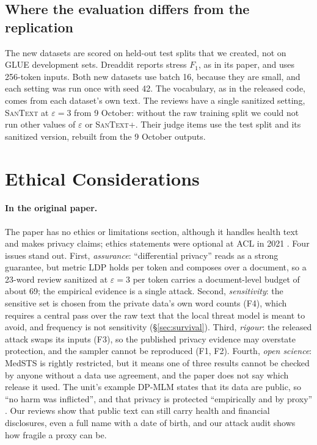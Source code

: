 \documentclass[11pt]{article}
\newcommand{\santext}{\textsc{SanText}}
\newcommand{\santextp}{\textsc{SanText}+}
\begin{document}
\subsection{Where the evaluation differs from the replication}
\label{sec:differs}
The new datasets are scored on held-out test splits that we created, not on GLUE development sets. Dreaddit reports stress $F_1$, as in its paper, and uses 256-token inputs. Both new datasets use batch 16, because they are small, and each setting was run once with seed 42. The vocabulary, as in the released code, comes from each dataset's own text. The reviews have a single sanitized setting, \santext{} at $\varepsilon = 3$ from 9 October: without the raw training split we could not run other values of $\varepsilon$ or \santextp{}. Their judge items use the test split and its sanitized version, rebuilt from the 9 October outputs.

\section{Ethical Considerations}
\label{sec:ethics}
\paragraph{In the original paper.} The paper has no ethics or limitations section, although it handles health text and makes privacy claims; ethics statements were optional at ACL in 2021 \citep{benotti-blackburn-2022-ethics}. Four issues stand out. First, \emph{assurance}: ``differential privacy'' reads as a strong guarantee, but metric LDP holds per token and composes over a document, so a 23-word review sanitized at $\varepsilon = 3$ per token carries a document-level budget of about 69; the empirical evidence is a single attack. Second, \emph{sensitivity}: the sensitive set is chosen from the private data's own word counts (F4), which requires a central pass over the raw text that the local threat model is meant to avoid, and frequency is not sensitivity (§\ref{sec:survival}). Third, \emph{rigour}: the released attack swaps its inputs (F3), so the published privacy evidence may overstate protection, and the sampler cannot be reproduced (F1, F2). Fourth, \emph{open science}: MedSTS is rightly restricted, but it means one of three results cannot be checked by anyone without a data use agreement, and the paper does not say which release it used. The unit's example DP-MLM states that its data are public, so ``no harm was inflicted'', and that privacy is protected ``empirically and by proxy'' \citep{meisenbacher-etal-2024-dp}. Our reviews show that public text can still carry health and financial disclosures, even a full name with a date of birth, and our attack audit shows how fragile a proxy can be.
\end{document}
